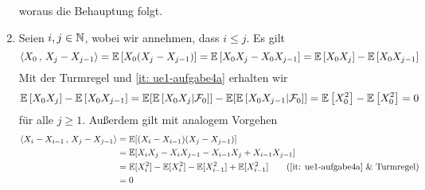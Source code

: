 \begin{exercisePage}
\begin{enumerate}[label=(\alph*), leftmargin=*]
		woraus die Behauptung folgt.
		\item Seien $i,j \in \mathbb{N}$, wobei wir annehmen, dass $i \leq j$. Es gilt
		\begin{equation*}
			\left\langle X_0\, ,\, X_j - X_{j-1} \right\rangle 
			= \mathbb{E} \left[ X_0(X_j - X_{j-1}) \right] 
			= \mathbb{E} \left[ X_0 X_j - X_0 X_{j-1} \right] 
			= \mathbb{E} \left[ X_0 X_j \right] - \mathbb{E} \left[ X_0 X_{j-1} \right]
		\end{equation*}
		Mit der Turmregel und \cref{it: ue1-aufgabe4a} erhalten wir
		\begin{equation*}
			\mathbb{E} \left[ X_0 X_j \right] - \mathbb{E} \left[ X_0 X_{j-1} \right]
			= \mathbb{E}[\mathbb{E} \left[ X_0 X_j | \mathcal{F}_0 \right]] - \mathbb{E}[\mathbb{E} \left[ X_0 X_{j-1} | \mathcal{F}_0 \right]]
			= \mathbb{E} \left[ X_0^2 \right] - \mathbb{E} \left[ X_0^2 \right] = 0
		\end{equation*}
		für alle $j \ge 1$.
		Außerdem gilt mit analogem Vorgehen
		\begin{align*}
			\scal{X_i- X_{i-1}}{X_j -X_{j-1}} 
			&= \E[(X_i- X_{i-1}) (X_j -X_{j-1})] \\
			&= \E[ X_i X_j - X_i X_{j-1} - X_{i-1} X_j + X_{i-1} X_{j-1}] \\
			&= \E[X_i^2] -\E[X_i^2]-\E[X_{i-1}^2]+\E[X_{i-1}^2] \tag{\ref{it: ue1-aufgabe4a} \& Turmregel} \\
			&= 0
		\end{align*}
	\end{enumerate}

\end{exercisePage}

